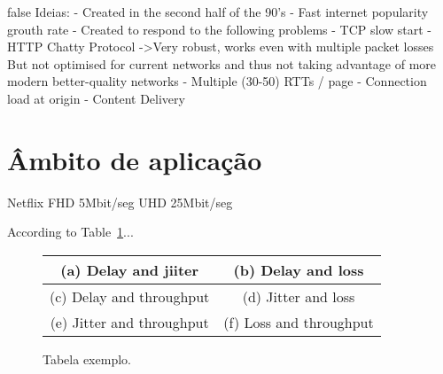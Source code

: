 \documentclass{llncs}
\begin{document}
\if false
Ideias: 	
	- Created in the second half of the 90's
	- Fast internet popularity grouth rate
	- Created to respond to the following problems
		- TCP slow start
		- HTTP Chatty Protocol
			->Very robust, works even with multiple packet losses
			    But not optimised for current networks and thus not taking advantage
			    of more modern better-quality networks
		- Multiple (30-50) RTTs / page
		- Connection load at origin
		- Content Delivery
\fi 

\section{Âmbito de aplicação}								%

Netflix FHD 5Mbit/seg
	   UHD 25Mbit/seg



According to Table~\ref{tab:TabelaExemplo}...

\begin{figure}
\centering
\begin{tabular}{|c|c|}\hline
(a) Delay and jiiter & (b) Delay and loss \\ \hline

(c) Delay and throughput & (d) Jitter and loss \\ \hline

(e) Jitter and throughput & (f) Loss and throughput \\ \hline
\end{tabular}
\caption{\label{tab:TabelaExemplo}Tabela exemplo.}
\end{figure}

\end{document}
